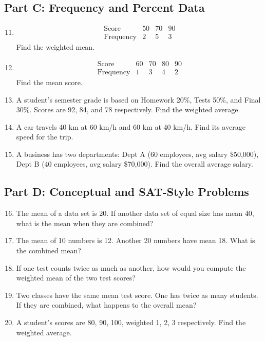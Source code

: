 \documentclass[14pt]{extarticle}
\begin{document}
\subsection*{Part C: Frequency and Percent Data}
\begin{enumerate}
  \setcounter{enumi}{10}
  \item 
  \[
  \begin{array}{c|ccc}
  \text{Score} & 50 & 70 & 90\\ \hline
  \text{Frequency} & 2 & 5 & 3
  \end{array}
  \]
  Find the weighted mean.

  \item 
  \[
  \begin{array}{c|cccc}
  \text{Score} & 60 & 70 & 80 & 90\\ \hline
  \text{Frequency} & 1 & 3 & 4 & 2
  \end{array}
  \]
  Find the mean score.

  \item A student’s semester grade is based on Homework 20\%, Tests 50\%, and Final 30\%. Scores are 92, 84, and 78 respectively. Find the weighted average.
  \item A car travels 40 km at 60 km/h and 60 km at 40 km/h. Find its average speed for the trip.
  \item A business has two departments: Dept A (60 employees, avg salary \$50,000), Dept B (40 employees, avg salary \$70,000). Find the overall average salary.
\end{enumerate}

\subsection*{Part D: Conceptual and SAT-Style Problems}
\begin{enumerate}
  \setcounter{enumi}{15}
  \item The mean of a data set is 20. If another data set of equal size has mean 40, what is the mean when they are combined?
  \item The mean of 10 numbers is 12. Another 20 numbers have mean 18. What is the combined mean?
  \item If one test counts twice as much as another, how would you compute the weighted mean of the two test scores?
  \item Two classes have the same mean test score. One has twice as many students. If they are combined, what happens to the overall mean?
  \item A student’s scores are 80, 90, 100, weighted 1, 2, 3 respectively. Find the weighted average.
\end{enumerate}
\end{document}
